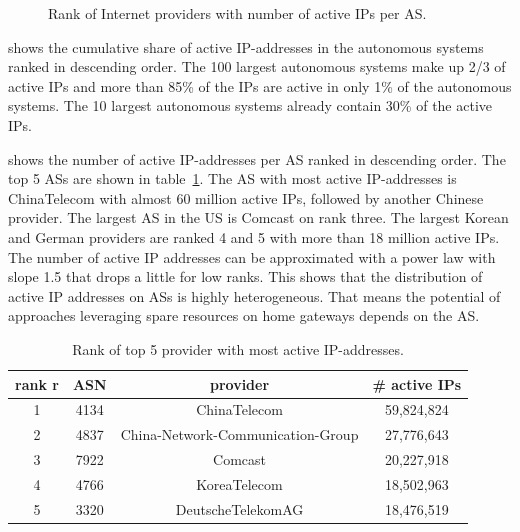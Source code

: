 \begin{figure}[bt]
\begin{minipage}[b]{0.49\textwidth}
  \caption{Rank of Internet providers with number of active IPs per AS.}
  \label{fig:asrank}
\end{minipage}
\end{figure}

 shows the cumulative share of active IP-addresses in the autonomous systems ranked in descending order.
The 100 largest autonomous systems make up 2/3 of active IPs and more than 85\% of the IPs are active in only 1\% of the autonomous systems. The 10 largest autonomous systems already contain 30\% of the active IPs.

 shows the number of active IP-addresses per AS ranked in descending order.
The top 5 ASs are shown in table~\ref{tab:asrank}.
The AS with most active IP-addresses is ChinaTelecom with almost 60 million active IPs, followed by another Chinese provider.
The largest AS in the US is Comcast on rank three.
The largest Korean and German providers are ranked 4 and 5 with more than 18 million active IPs.
The number of active IP addresses can be approximated with a power law with slope 1.5 that drops a little for low ranks.
This shows that the distribution of active IP addresses on ASs is highly heterogeneous.
That means the potential of approaches leveraging spare resources on home gateways depends on the AS.

\begin{table}[tb]
\centering
\caption{Rank of top 5 provider with most active IP-addresses.}
\label{tab:asrank}
\begin{tabular}{|c|c|c|c|}
\hline
rank r & ASN & provider & \# active IPs  \\
\hline
1 & 4134 & ChinaTelecom & 59,824,824 \\
2 & 4837 & China-Network-Communication-Group & 27,776,643 \\
3 & 7922 & Comcast & 20,227,918 \\
4 & 4766 & KoreaTelecom & 18,502,963 \\
5 & 3320 & DeutscheTelekomAG & 18,476,519 \\
\hline
\end{tabular}
\end{table}
%

%
%
%
